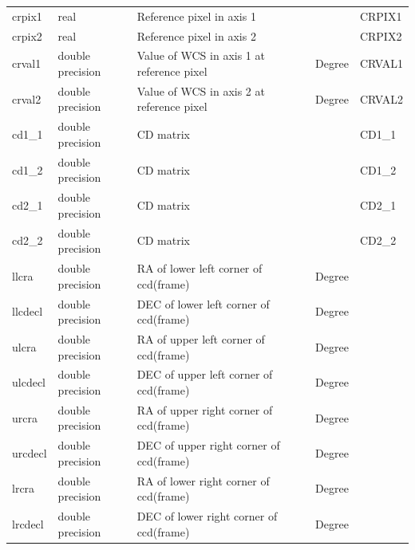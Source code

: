 \documentclass[12pt]{article}
\begin{document}
\begin{table}[thbp]
\begin{center}
{\begin{tabular}{llllll}
crpix1 & real & Reference pixel in axis 1                           &                            &             & CRPIX1  \\
crpix2 & real & Reference pixel in axis 2                           &                            &             & CRPIX2  \\
crval1 & double precision & Value of WCS in axis 1 at reference pixel           &                            & Degree      & CRVAL1  \\
crval2 & double precision & Value of WCS in axis 2 at reference pixel           &                            & Degree      & CRVAL2  \\
cd1\_1 & double precision & CD matrix                                           &                            &             & CD1\_1  \\
cd1\_2 & double precision & CD matrix                                           &                            &             & CD1\_2  \\
cd2\_1 & double precision & CD matrix                                           &                            &             & CD2\_1  \\
cd2\_2 & double precision & CD matrix                                           &                            &             & CD2\_2  \\
llcra & double precision & RA of lower left corner of ccd(frame)               &                            & Degree      &   \\
llcdecl & double precision & DEC of lower left corner of ccd(frame)              &                            & Degree      &   \\
ulcra & double precision & RA of upper left corner of ccd(frame)               &                            & Degree      &   \\
ulcdecl & double precision & DEC of upper left corner of ccd(frame)              &                            & Degree      &   \\
urcra & double precision & RA of upper right corner of ccd(frame)              &                            & Degree      &   \\
urcdecl & double precision & DEC of upper right corner of ccd(frame)             &                            & Degree      &   \\
lrcra & double precision & RA of lower right corner of ccd(frame)              &                            & Degree      &   \\
lrcdecl & double precision & DEC of lower right corner of ccd(frame)             &                            & Degree      &   \\

\end{tabular}}
\end{center}
\end{table}
\end{document}
